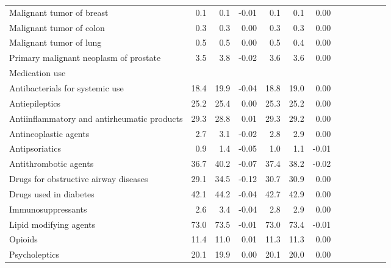 \documentclass[11pt,]{article}
\begin{document}
\begin{longtable}{lrrrrrrrrrrrr}
      Malignant tumor of breast &  0.1 &  0.1 & -0.01 &  0.1 &  0.1 &  0.00 \\ 
      Malignant tumor of colon &  0.3 &  0.3 &  0.00 &  0.3 &  0.3 &  0.00 \\ 
      Malignant tumor of lung &  0.5 &  0.5 &  0.00 &  0.5 &  0.4 &  0.00 \\ 
      Primary malignant neoplasm of prostate &  3.5 &  3.8 & -0.02 &  3.6 &  3.6 &  0.00 \\ 
  Medication use &    &    &     &    &    &     \\ 
      Antibacterials for systemic use & 18.4 & 19.9 & -0.04 & 18.8 & 19.0 &  0.00 \\ 
      Antiepileptics & 25.2 & 25.4 &  0.00 & 25.3 & 25.2 &  0.00 \\ 
      Antiinflammatory and antirheumatic products & 29.3 & 28.8 &  0.01 & 29.3 & 29.2 &  0.00 \\ 
      Antineoplastic agents &  2.7 &  3.1 & -0.02 &  2.8 &  2.9 &  0.00 \\ 
      Antipsoriatics &  0.9 &  1.4 & -0.05 &  1.0 &  1.1 & -0.01 \\ 
      Antithrombotic agents & 36.7 & 40.2 & -0.07 & 37.4 & 38.2 & -0.02 \\ 
      Drugs for obstructive airway diseases & 29.1 & 34.5 & -0.12 & 30.7 & 30.9 &  0.00 \\ 
      Drugs used in diabetes & 42.1 & 44.2 & -0.04 & 42.7 & 42.9 &  0.00 \\ 
      Immunosuppressants &  2.6 &  3.4 & -0.04 &  2.8 &  2.9 &  0.00 \\ 
      Lipid modifying agents & 73.0 & 73.5 & -0.01 & 73.0 & 73.4 & -0.01 \\ 
      Opioids & 11.4 & 11.0 &  0.01 & 11.3 & 11.3 &  0.00 \\ 
      Psycholeptics & 20.1 & 19.9 &  0.00 & 20.1 & 20.0 &  0.00 \\ 
   \bottomrule\end{longtable}
\clearpage
{}
\end{document}
